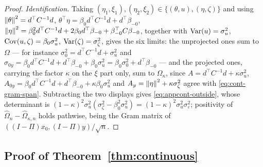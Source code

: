 \begin{proof}
{\emph{Identification.} Taking
$(\eta_1,\xi_1), (\eta_2,\xi_2) \in \{ (\theta, u), (\eta, \zeta) \}$ and
using $\left\lVert \theta \right\rVert^2 = d^\top C^{-1} d$, $\theta^\top \eta
= \beta_0 d^\top C^{-1} d + d^\top \beta_{-0}$,
$\left\lVert \eta \right\rVert^2 = \beta_0^2 d^\top C^{-1} d + 2\beta_0 d^\top \beta_{-0}
+ \beta_{-0}^\top C \beta_{-0}$, together with $\operatorname{Var}(u) = \sigma_u^2$,
$\operatorname{Cov}(u, \zeta) = \beta_0 \sigma_u^2$, $\operatorname{Var}(\zeta) = \sigma_\zeta^2$,
gives the six limits: the unprojected ones sum to
$\Omega$ --- for instance
$\sigma_0^2 = d^\top C^{-1} d + \sigma_u^2$ and
$\sigma_{0y} = \beta_0 d^\top C^{-1}d + d^\top \beta_{-0}
+ \beta_0 \sigma_u^2 = \beta_0 \sigma_0^2 + d^\top \beta_{-0}$ --- and
the projected ones, carrying the factor $\kappa$ on the $\xi$ part only,
sum to $\Omega_\kappa$, since
$A = d^\top C^{-1} d + \kappa \sigma_u^2$,
$A_{0y} = \beta_0 d^\top C^{-1} d + d^\top \beta_{-0}
+ \kappa \beta_0 \sigma_u^2$ and
$A_y = \left\lVert \eta \right\rVert^2 + \kappa \sigma_\zeta^2$ agree with
\eqref{eq:cont-gram-span}. Subtracting the two displays gives
\eqref{eq:appcont-outside}, whose determinant is
$(1-\kappa)^2 \sigma_u^2 (\sigma_\zeta^2 - \beta_0^2 \sigma_u^2)
= (1-\kappa)^2 \sigma_u^2 \sigma_\varepsilon^2$; positivity of
$\hat\Omega_n - \hat\Omega_{\kappa,n}$ holds pathwise, being the Gram
matrix of $((I-\Pi) x_0, (I-\Pi) y) / \sqrt n$.}
\end{proof}

\subsection{Proof of Theorem~\ref{thm:continuous}}
\label{app:cont-coef}

